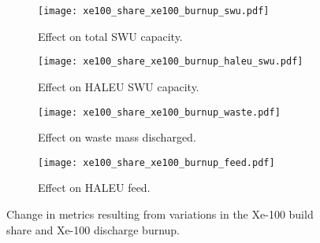 \begin{figure}    
    \begin{subfigure}[t]{0.48\textwidth}
        \centering
        \texttt{[image: xe100\_share\_xe100\_burnup\_swu.pdf]}
        \caption{Effect on total SWU capacity.}
        \label{fig:xe100_share_xe100_burnup_swu}
    \end{subfigure}
    \hfill
    \begin{subfigure}[t]{0.48\textwidth}
        \centering
        \texttt{[image: xe100\_share\_xe100\_burnup\_haleu\_swu.pdf]}
        \caption{Effect on HALEU SWU capacity.}
        \label{fig:xe100_share_xe100_burnup_haleu_swu}
    \end{subfigure}
    
    \begin{subfigure}[t]{0.48\textwidth}
        \centering
        \texttt{[image: xe100\_share\_xe100\_burnup\_waste.pdf]}
        \caption{Effect on waste mass discharged.}
        \label{fig:xe100_share_xe100_burnup_waste}
    \end{subfigure}
    \hfill
    \begin{subfigure}[t]{0.48\textwidth}
        \centering
        \texttt{[image: xe100\_share\_xe100\_burnup\_feed.pdf]}
        \caption{Effect on HALEU feed.}
        \label{fig:xe100_share_xe100_burnup_feed}
    \end{subfigure}
    \caption{Change in metrics resulting from variations in the 
    Xe-100 build share and Xe-100 discharge burnup.}
    \label{fig:xe100_share_xe100_burnup}
\end{figure}
